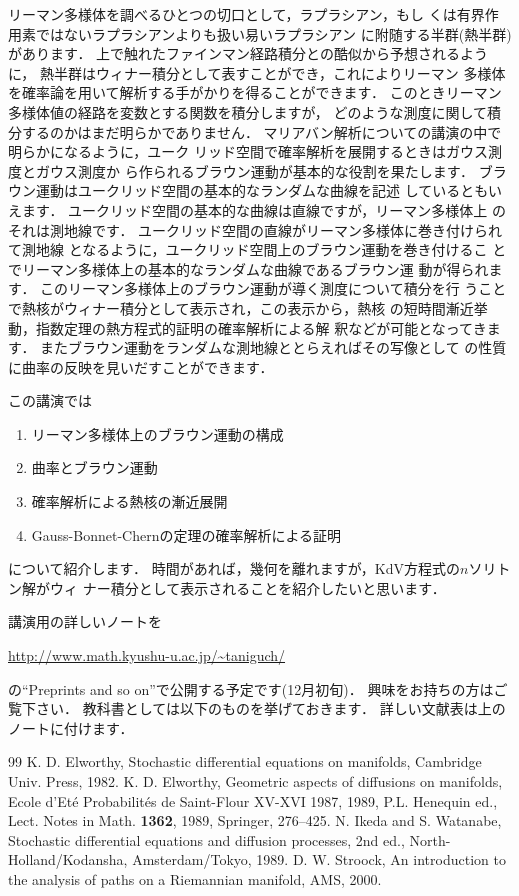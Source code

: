 \documentclass[uplatex,dvipdfmx]{jlreq}
\begin{document}
リーマン多様体を調べるひとつの切口として，ラプラシアン，もし
くは有界作用素ではないラプラシアンよりも扱い易いラプラシアン
に附随する半群(熱半群)があります．
上で触れたファインマン経路積分との酷似から予想されるように，
熱半群はウィナー積分として表すことができ，これによりリーマン
多様体を確率論を用いて解析する手がかりを得ることができます．
このときリーマン多様体値の経路を変数とする関数を積分しますが，
どのような測度に関して積分するのかはまだ明らかでありません．
マリアバン解析についての講演の中で明らかになるように，ユーク
リッド空間で確率解析を展開するときはガウス測度とガウス測度か
ら作られるブラウン運動が基本的な役割を果たします．
ブラウン運動はユークリッド空間の基本的なランダムな曲線を記述
しているともいえます．
ユークリッド空間の基本的な曲線は直線ですが，リーマン多様体上
のそれは測地線です．
ユークリッド空間の直線がリーマン多様体に巻き付けられて測地線
となるように，ユークリッド空間上のブラウン運動を巻き付けるこ
とでリーマン多様体上の基本的なランダムな曲線であるブラウン運
動が得られます．
このリーマン多様体上のブラウン運動が導く測度について積分を行
うことで熱核がウィナー積分として表示され，この表示から，熱核
の短時間漸近挙動，指数定理の熱方程式的証明の確率解析による解
釈などが可能となってきます．
またブラウン運動をランダムな測地線ととらえればその写像として
の性質に曲率の反映を見いだすことができます．

この講演では
\begin{enumerate}
\item リーマン多様体上のブラウン運動の構成
\item 曲率とブラウン運動
\item 確率解析による熱核の漸近展開
\item Gauss-Bonnet-Chernの定理の確率解析による証明
\end{enumerate}
について紹介します．
時間があれば，幾何を離れますが，KdV方程式の$n$ソリトン解がウィ
ナー積分として表示されることを紹介したいと思います．

講演用の詳しいノートを
\begin{center}
\url{http://www.math.kyushu-u.ac.jp/~taniguch/}
\end{center}
の``Preprints and so on''で公開する予定です(12月初旬)．
興味をお持ちの方はご覧下さい．
教科書としては以下のものを挙げておきます．
詳しい文献表は上のノートに付けます．

\begin{thebibliography}{99}
K. D. Elworthy,
Stochastic differential equations on manifolds,
Cambridge Univ. Press, 1982.
K. D. Elworthy,
Geometric aspects of diffusions on manifolds,
Ecole d'Et\'e Probabilit\'es de Saint-Flour XV-XVI 1987,
1989,
P.L. Henequin ed., Lect. Notes in Math. {\bfseries 1362}, 1989,
Springer, 276--425.
N. Ikeda and S. Watanabe,
Stochastic differential equations and diffusion processes,
2nd ed.,
North-Holland/Kodansha, Amsterdam/Tokyo, 1989.
D. W. Stroock,
An introduction to the analysis of paths on a Riemannian
manifold,
AMS, 2000.
\end{thebibliography}
\end{document}
